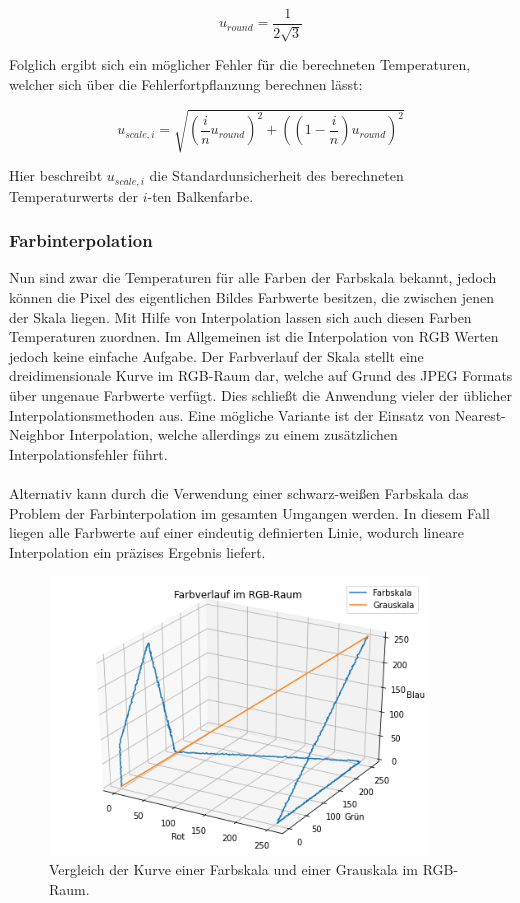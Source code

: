 \documentclass[10pt,a4paper,german]{article}
\begin{document}
\begin{equation}
    u_{round} = \frac{1}{2\sqrt{3}}
\end{equation}

Folglich ergibt sich ein möglicher Fehler für die berechneten Temperaturen, welcher sich über die Fehlerfortpflanzung berechnen lässt:

\begin{equation}
    u_{scale,i} = \sqrt{\left(\frac{i}{n} u_{round} \right)^2 + \left(\left(1 - \frac{i}{n}\right) u_{round}\right)^2}
\end{equation}

Hier beschreibt $u_{scale,i}$ die Standardunsicherheit des berechneten Temperaturwerts der $i$-ten Balkenfarbe.

\subsubsection{Farbinterpolation}
Nun sind zwar die Temperaturen für alle Farben der Farbskala bekannt, jedoch können die Pixel des eigentlichen Bildes Farbwerte besitzen, die zwischen jenen der Skala liegen.
Mit Hilfe von Interpolation lassen sich auch diesen Farben Temperaturen zuordnen.
Im Allgemeinen ist die Interpolation von RGB Werten jedoch keine einfache Aufgabe. 
Der Farbverlauf der Skala stellt eine dreidimensionale Kurve im RGB-Raum dar, welche auf Grund des JPEG Formats über ungenaue Farbwerte verfügt.
Dies schließt die Anwendung vieler der üblicher Interpolationsmethoden aus.
Eine mögliche Variante ist der Einsatz von Nearest-Neighbor Interpolation, welche allerdings zu einem zusätzlichen Interpolationsfehler führt.
\\
\\
Alternativ kann durch die Verwendung einer schwarz-weißen Farbskala das Problem der Farbinterpolation im gesamten Umgangen werden.
In diesem Fall liegen alle Farbwerte auf einer eindeutig definierten Linie, wodurch lineare Interpolation ein präzises Ergebnis liefert.

\begin{figure}[H]
    \centering
    \captionsetup{width=8cm}
    \includegraphics[width=10cm]{img/farb_vs_grau.png}
    \caption{Vergleich der Kurve einer Farbskala und einer Grauskala im RGB-Raum.}
\end{figure}
\end{document}

